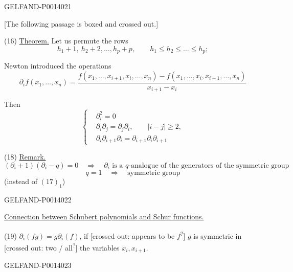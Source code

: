 \begin{GelfandAdjacentEvidence}{GELFAND-P001402}{1}

[The following passage is boxed and crossed out.]

(16) \uline{Theorem.} Let us permute the rows
\[
h_1+1,\ h_2+2,\ldots,h_p+p,\qquad h_1\le h_2\le\ldots\le h_p;
\]

Newton introduced the operations
\begin{equation*}
\partial_i f(x_1,\ldots,x_n)=
\frac{f(x_1,\ldots,x_{i+1},x_i,\ldots,x_n)
      -f(x_1,\ldots,x_i,x_{i+1},\ldots,x_n)}
     {x_{i+1}-x_i} \tag{16}
\end{equation*}

Then
\begin{equation*}
\left\{\begin{aligned}
&\partial_i^2=0\\
&\partial_i\partial_j=\partial_j\partial_i,\qquad \lvert i-j\rvert\ge2,\\
&\partial_i\partial_{i+1}\partial_i=\partial_{i+1}\partial_i\partial_{i+1}
\end{aligned}\right. \tag{17}
\end{equation*}

(18) \uline{Remark.}
\[
(\partial_i+1)(\partial_i-q)=0
\quad\Rightarrow\quad \partial_i\text{ is a \(q\)-analogue of the generators of the symmetric group}
\]
\[
q=1\quad\Rightarrow\quad\text{symmetric group}
\]
(instead of \((17)_1\))
\end{GelfandAdjacentEvidence}
\begin{GelfandAdjacentEvidence}{GELFAND-P001402}{2}



\uline{Connection between Schubert polynomials and Schur functions.}

(19) \(\partial_i(fg)=g\partial_i(f)\), if
[crossed out: appears to be \(f\)\textsuperscript{?}]
\(g\) is symmetric in
[crossed out: two / all\textsuperscript{?}]
the variables \(x_i,x_{i+1}\).

\end{GelfandAdjacentEvidence}
\begin{GelfandAdjacentEvidence}{GELFAND-P001402}{3}

\end{GelfandAdjacentEvidence}
